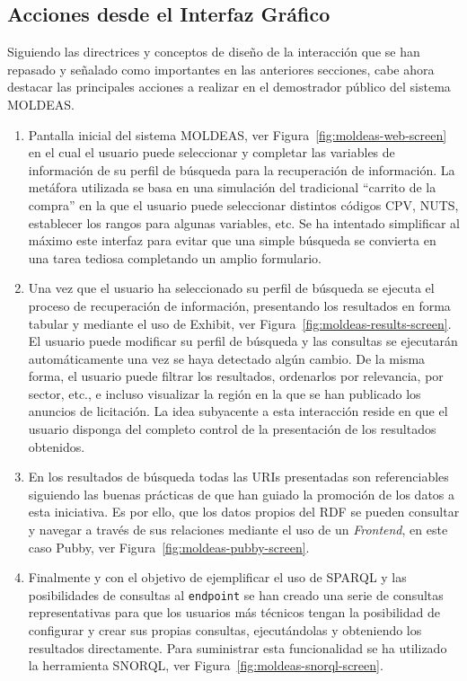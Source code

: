 \subsection{Acciones desde el Interfaz Gráfico}
Siguiendo las directrices y conceptos de diseño de la interacción que se han 
repasado y señalado como importantes en las anteriores secciones, cabe ahora 
destacar las principales acciones a realizar en el demostrador público 
del sistema \gls{MOLDEAS}.

\begin{enumerate}
 \item Pantalla inicial del sistema MOLDEAS, ver Figura~\ref{fig:moldeas-web-screen} en el cual el usuario puede 
seleccionar y completar las variables de información de su perfil 
de búsqueda para la recuperación de información. La metáfora utilizada 
se basa en una simulación del tradicional ``carrito de la compra'' en la que 
el usuario puede seleccionar distintos códigos \gls{CPV}, \gls{NUTS}, establecer 
los rangos para algunas variables, etc. Se ha intentado simplificar 
al máximo este interfaz para evitar que una simple búsqueda se convierta 
en una tarea tediosa completando un amplio formulario.


\item Una vez que el usuario ha seleccionado su perfil de búsqueda se ejecuta 
el proceso de recuperación de información, presentando los resultados en forma 
tabular y mediante el uso de Exhibit, ver Figura~\ref{fig:moldeas-results-screen}. El usuario 
puede modificar su perfil de búsqueda y las consultas se ejecutarán automáticamente una 
vez se haya detectado algún cambio. De la misma forma, el usuario puede filtrar los resultados, 
ordenarlos por relevancia, por sector, etc., e incluso visualizar la región en la 
que se han publicado los anuncios de licitación. La idea subyacente a esta 
interacción reside en que el usuario disponga del completo control de la presentación 
de los resultados obtenidos.


\item En los resultados de búsqueda todas las \gls{URI}s presentadas son referenciables siguiendo 
las buenas prácticas de \linkeddata que han guiado la promoción de los datos a esta iniciativa. 
Es por ello, que los datos propios del \dataset \gls{RDF} se pueden consultar y navegar a través de sus 
relaciones mediante el uso de un \linkeddata \textit{Frontend}, en este caso Pubby, ver Figura~\ref{fig:moldeas-pubby-screen}. 


\item Finalmente y con el objetivo de ejemplificar el uso de \gls{SPARQL} y las posibilidades 
de consultas al \texttt{endpoint} se han creado una serie de consultas representativas 
para que los usuarios más técnicos tengan la posibilidad de configurar y crear sus propias 
consultas, ejecutándolas y obteniendo los resultados directamente. Para suministrar esta funcionalidad 
se ha utilizado la herramienta \gls{SNORQL}, ver Figura~\ref{fig:moldeas-snorql-screen}.


\end{enumerate}


